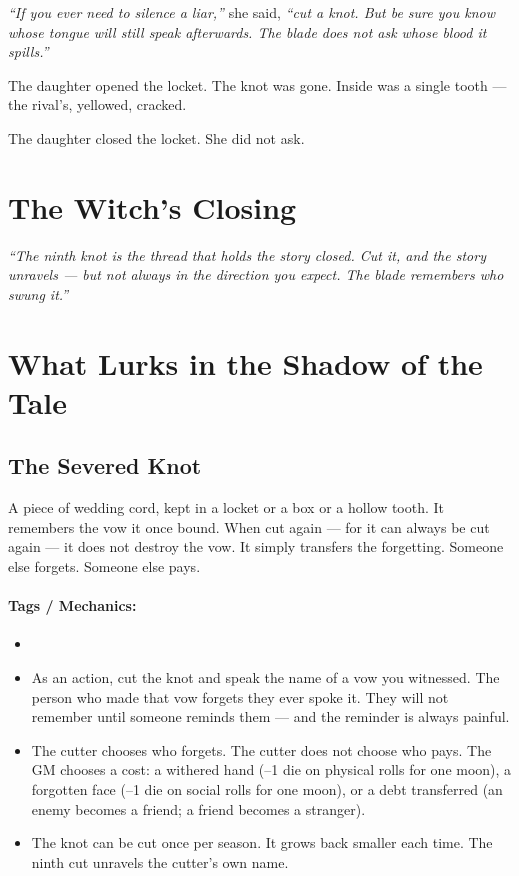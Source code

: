 \textit{``If you ever need to silence a liar,''} she said, \textit{``cut a knot. But be sure you know whose tongue will still speak afterwards. The blade does not ask whose blood it spills.''}

The daughter opened the locket. The knot was gone. Inside was a single tooth — the rival's, yellowed, cracked.

The daughter closed the locket. She did not ask.

\section*{The Witch's Closing}

\textit{``The ninth knot is the thread that holds the story closed. Cut it, and the story unravels — but not always in the direction you expect. The blade remembers who swung it.''}

\section*{What Lurks in the Shadow of the Tale}

\subsection*{The Severed Knot}

A piece of wedding cord, kept in a locket or a box or a hollow tooth. It remembers the vow it once bound. When cut again — for it can always be cut again — it does not destroy the vow. It simply transfers the forgetting. Someone else forgets. Someone else pays.

\paragraph{Tags / Mechanics:}
\begin{itemize}
\item [CURSE] [TRUTH] [OATH]
\item As an action, cut the knot and speak the name of a vow you witnessed. The person who made that vow forgets they ever spoke it. They will not remember until someone reminds them — and the reminder is always painful.
\item The cutter chooses who forgets. The cutter does not choose who pays. The GM chooses a cost: a withered hand (--1 die on physical rolls for one moon), a forgotten face (--1 die on social rolls for one moon), or a debt transferred (an enemy becomes a friend; a friend becomes a stranger).
\item The knot can be cut once per season. It grows back smaller each time. The ninth cut unravels the cutter's own name.
\end{itemize}

